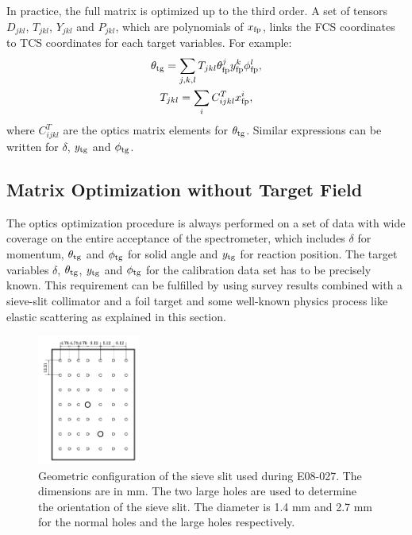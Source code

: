 In practice, the full matrix is optimized up to the third order. A set of tensors $D_{jkl}$, $T_{jkl}$, $Y_{jkl}$ and $P_{jkl}$, which are polynomials of $x_{\mathrm{fp}}$, links the FCS coordinates to TCS coordinates for each target variables. For example:
\begin{gather} \label{C6S2E3}
\theta_{\mathrm{tg}} = \sum_{j,k,l} T_{jkl} \theta_{\mathrm{fp}}^j y_{\mathrm{fp}}^k \phi_{\mathrm{fp}}^l, \\ \label{C6S2E4}
T_{jkl} = \sum_i C_{ijkl}^{T} x_{\mathrm{fp}}^i,
\end{gather}
where $C_{ijkl}^{T}$ are the optics matrix elements for $\theta_{\mathrm{tg}}$. Similar expressions can be written for $\delta$, $y_{\mathrm{tg}}$ and $\phi_{\mathrm{tg}}$.

\subsection{Matrix Optimization without Target Field}
\label{C6S2SS2}

The optics optimization procedure is always performed on a set of data with wide coverage on the entire acceptance of the spectrometer, which includes $\delta$ for momentum, $\theta_{\mathrm{tg}}$ and $\phi_{\mathrm{tg}}$ for solid angle and $y_{\mathrm{tg}}$ for reaction position. The target variables $\delta$, $\theta_{\mathrm{tg}}$, $y_{\mathrm{tg}}$ and $\phi_{\mathrm{tg}}$ for the calibration data set has to be precisely known. This requirement can be fulfilled by using survey results combined with a sieve-slit collimator and a foil target and some well-known physics process like elastic scattering as explained in this section.

\begin{figure}[b!]
  \centering
  \includegraphics[width=0.3\textwidth]{figs/sieve-slit.png}
  \caption[Geometric configuration of the sieve slit.]{Geometric configuration of the sieve slit used during E08-027. The dimensions are in mm. The two large holes are used to determine the orientation of the sieve slit. The diameter is 1.4 mm and 2.7 mm for the normal holes and the large holes respectively. \label{C6S2F1}}
\end{figure}

